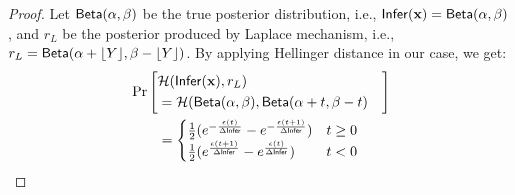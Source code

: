 \documentclass{article}
\begin{document}
\begin{proof}
Let $\mathsf{Beta}(\alpha, \beta)$ be the true posterior distribution, i.e., $\mathsf{Infer}(\textbf{x}) = \mathsf{Beta}(\alpha, \beta)$, and $r_L$ be the posterior produced by Laplace mechanism, i.e., $r_L = \mathsf{Beta}(\alpha + \lfloor Y \rfloor, \beta - \lfloor Y \rfloor)$. By applying Hellinger distance in our case, we get:
\begin{align*}
&
\Pr\left[
\begin{aligned}
\lefteqn{\hellinger(\bysinfer(\dataobs), r_L )}\\ 
&= \hellinger(\betad(\alpha, \beta), \betad(\alpha + t, \beta - t)
\end{aligned}
\right]
\\
&\qquad = 
\begin{cases}
\frac{1}{2} (e^{- \frac{\epsilon (t)}{\Delta \bysinfer}} - e^{- \frac{\epsilon (t + 1)}{\Delta \bysinfer}}) &  t \geq 0\\
\frac{1}{2} (e^{\frac{\epsilon (t + 1)}{\Delta \bysinfer}} - e^{\frac{\epsilon (t)}{\Delta \bysinfer}}) & t < 0
\end{cases}
\end{align*}


\end{proof}
\end{document}
